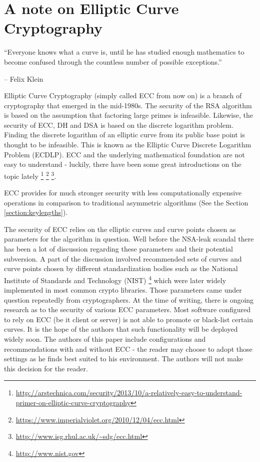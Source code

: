 \section{A note on Elliptic Curve Cryptography}
\label{section:EllipticCurveCryptography}


\epigraph{``Everyone knows what a curve is, until he has studied enough
mathematics to become confused through the countless number of possible
exceptions.''}{-- Felix Klein }

Elliptic Curve Cryptography (simply called ECC from now on) is a branch of
cryptography that emerged in the mid-1980s.  The security of the RSA
algorithm is based on the assumption that factoring large primes is infeasible.
Likewise, the security of ECC, DH and DSA is based on the discrete logarithm
problem\cite{Wikipedia:Discrete,McC90,WR13}.  Finding the discrete logarithm of
an elliptic curve from its public base point is thought to be infeasible. This
is known as the Elliptic Curve Discrete Logarithm Problem (ECDLP). ECC and the
underlying mathematical foundation are not easy to understand - luckily, there
have been some great introductions on the topic lately
\footnote{\url{http://arstechnica.com/security/2013/10/a-relatively-easy-to-understand-primer-on-elliptic-curve-cryptography}}
\footnote{\url{https://www.imperialviolet.org/2010/12/04/ecc.html}}
\footnote{\url{http://www.isg.rhul.ac.uk/~sdg/ecc.html}}.

ECC provides for much stronger security with less computationally expensive
operations in comparison to traditional asymmetric algorithms (See the Section
\ref{section:keylengths}).


The security of ECC relies on the elliptic curves and curve points chosen as
parameters for the algorithm in question. Well before the NSA-leak scandal
there has been a lot of discussion regarding these parameters and their
potential subversion. A part of the discussion involved recommended sets of
curves and curve points chosen by different standardization bodies such as the
National Institute of Standards and Technology (NIST)
\footnote{\url{http://www.nist.gov}} which were later widely implemented in
most common crypto libraries. Those parameters came under question repeatedly
from cryptographers\cite{BL13,Sch13b,W13}.  At the time of writing, there is
ongoing research as to the security of various ECC parameters\cite{DJBSC}.
Most software configured to rely on ECC (be it client or server) is not able to
promote or black-list certain curves. It is the hope of the authors that such
functionality will be deployed widely soon.  The authors of this paper include
configurations and recommendations with and without ECC - the reader may choose
to adopt those settings as he finds best suited to his environment. The authors
will not make this decision for the reader.


